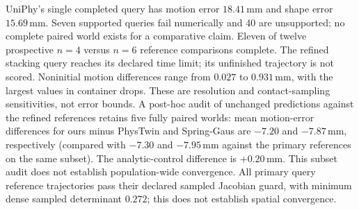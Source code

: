 UniPhy's single completed query has motion error $18.41$\,mm and shape
error $15.69$\,mm. Seven supported queries fail numerically and 40 are
unsupported; no complete paired world exists for a comparative claim.
Eleven of twelve prospective $n=4$ versus $n=6$ reference comparisons complete.
The refined stacking query reaches its declared time limit; its unfinished
trajectory is not scored. Noninitial motion differences range from
$0.027$ to $0.931$\,mm, with the largest values in container drops.
These are resolution and contact-sampling sensitivities, not error bounds.
A post-hoc audit of unchanged predictions against the refined references
retains five fully paired worlds: mean motion-error differences for ours
minus PhysTwin and Spring-Gaus are $-7.20$ and $-7.87$\,mm, respectively
(compared with $-7.30$ and $-7.95$\,mm against the primary references on
the same subset). The analytic-control difference is $+0.20$\,mm.
This subset audit does not establish population-wide convergence. All primary query reference trajectories pass their declared
sampled Jacobian guard, with minimum dense sampled determinant $0.272$;
this does not establish spatial convergence.
